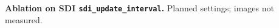   \centering
  \setlength{\tabcolsep}{1pt}
  \renewcommand{\arraystretch}{0.6}
  \caption{\textbf{Ablation on SDI \texttt{sdi\_update\_interval}.} Planned settings; images not measured.}
  \label{fig:abl_sdi_interval}
